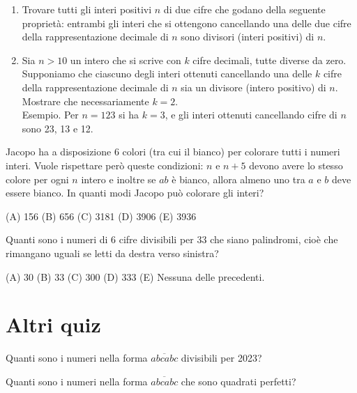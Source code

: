 \begin{esercizio}
    \label{ex:distrettuali_2018_15}
    \begin{enumerate}
        \item Trovare tutti gli interi positivi $n$ di due cifre che godano della seguente proprietà: entrambi
        gli interi che si ottengono cancellando una delle due cifre della rappresentazione decimale
        di $n$ sono divisori (interi positivi) di $n$.
        \item Sia $n > 10$ un intero che si scrive con $k$ cifre decimali, tutte diverse da zero.
        Supponiamo che ciascuno degli interi ottenuti cancellando una delle $k$ cifre della rappresentazione decimale
        di $n$ sia un divisore (intero positivo) di $n$.
        Mostrare che necessariamente $k = 2$. \\
        Esempio.
        Per $n = 123$ si ha $k = 3$, e gli interi ottenuti cancellando cifre di $n$ sono 23, 13 e 12.
    \end{enumerate}
\end{esercizio}

\begin{esercizio}
    \label{ex:distrettuali_2019}
    Jacopo ha a disposizione 6 colori (tra cui il bianco) per colorare tutti i numeri interi.
    Vuole rispettare però queste condizioni: $n$ e $n + 5$ devono avere lo stesso colore per ogni $n$ intero e
    inoltre se $ab$ è bianco, allora almeno uno tra $a$ e $b$ deve essere bianco.
    In quanti modi Jacopo può colorare gli interi?

    (A) 156 \quad (B) 656 \quad (C) 3181 \quad (D) 3906 \quad (E) 3936
\end{esercizio}

\begin{esercizio}
    \label{ex:distrettuali_2021}
    Quanti sono i numeri di 6 cifre divisibili per 33 che siano palindromi, cioè che rimangano uguali
    se letti da destra verso sinistra?

    (A) 30 \quad (B) 33 \quad (C) 300 \quad (D) 333 \quad (E) Nessuna delle precedenti.
\end{esercizio}

\section{Altri quiz}
\label{sec:quiz_altri}

\begin{esercizio}
    \label{ex:francesco_1}
    Quanti sono i numeri nella forma $\overline{abcabc}$ divisibili per 2023?
\end{esercizio}

\begin{esercizio}
    \label{ex:francesco_2}
    Quanti sono i numeri nella forma $\overline{abcabc}$ che sono quadrati perfetti?
\end{esercizio}
